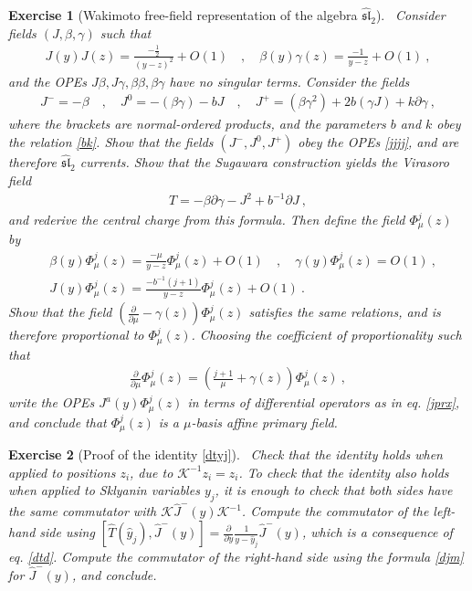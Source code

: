 \documentclass[12pt,a4paper,notitlepage]{report}
\numberwithin{equation}{section}
\theoremstyle{break}
\newtheorem{exo}{Exercise}[chapter]
\begin{document}
\begin{exo}[Wakimoto free-field representation of the algebra $\widehat{\mathfrak{sl}}_2$]
 ~\label{exowaki}
Consider fields $(J,\beta,\gamma)$ such that 
\begin{align}
 J(y)J(z) = \frac{-\frac12}{(y-z)^2} + O(1) \quad , \quad \beta(y)\gamma(z) = \frac{-1}{y-z} + O(1)\ ,
\end{align}
and the OPEs $J\beta,J\gamma,\beta\beta,\beta\gamma$ have no singular terms.
Consider the fields 
\begin{align}
 J^- = -\beta \quad , \quad J^0 = -(\beta\gamma) - bJ \quad , \quad J^+ = (\beta\gamma^2)+2b(\gamma J)+k\partial\gamma\ ,
\end{align}
where the brackets are normal-ordered products, and the parameters $b$ and $k$ obey the relation \eqref{bk}.
Show that the fields $(J^-,J^0,J^+)$ obey the OPEs \eqref{jjjj}, and are therefore $\widehat{\mathfrak{sl}}_2$ currents. 
Show that the Sugawara construction yields the Virasoro field
\begin{align}
 T = -\beta \partial\gamma - J^2 +b^{-1}\partial J\ ,
\end{align}
and rederive the central charge from this formula.
Then define the field $\Phi^j_\mu(z)$ by 
\begin{align}
 & \beta(y)\Phi^j_\mu(z) = \frac{-\mu}{y-z}\Phi^j_\mu(z)+ O(1) \quad , \quad \gamma(y)\Phi^j_\mu(z)=O(1)\ , 
\\
 & J(y)\Phi^j_\mu(z) = \frac{-b^{-1}(j+1)}{y-z}\Phi^j_\mu(z)+ O(1)\ .
\end{align}
Show that the field $\left({\frac{\partial}{\partial \mu}}-\gamma(z)\right)\Phi^j_\mu(z)$ satisfies the same relations, and is therefore proportional to $\Phi^j_\mu(z)$.
Choosing the coefficient of proportionality such that
\begin{align}
 {\frac{\partial}{\partial \mu}}\Phi^j_\mu(z) =\left(\frac{j+1}{\mu}+\gamma(z)\right)\Phi^j_\mu(z)\ ,
\end{align}
write the OPEs $J^a(y)\Phi^j_\mu(z)$ in terms of differential operators as in eq. \eqref{jprx}, and conclude that $\Phi^j_\mu(z)$ is a $\mu$-basis affine primary field.
\end{exo}

\begin{exo}[Proof of the identity \eqref{dtyj}]
 ~\label{exoktk}
Check that the identity holds when applied to positions $z_i$, due to $\mathcal{K}^{-1}z_i = z_i$. 
To check that the identity also holds when applied to Sklyanin variables $y_j$, it is enough to check 
that both sides have the same commutator with $\mathcal{K}\hat{J}^-(y)\mathcal{K}^{-1}$. 
Compute the commutator of the left-hand side using $[\hat{T}(\hat{y}_j),\hat{J}^-(y)]={\frac{\partial}{\partial y}}\frac{1}{y-\hat{y}_j}\hat{J}^-(y)$, which is a consequence of eq. \eqref{dtd}.
Compute the commutator of the 
right-hand side using the formula \eqref{djm} for $\hat{J}^-(y)$, and conclude.
\end{exo}


\printindex




%
\end{document}
